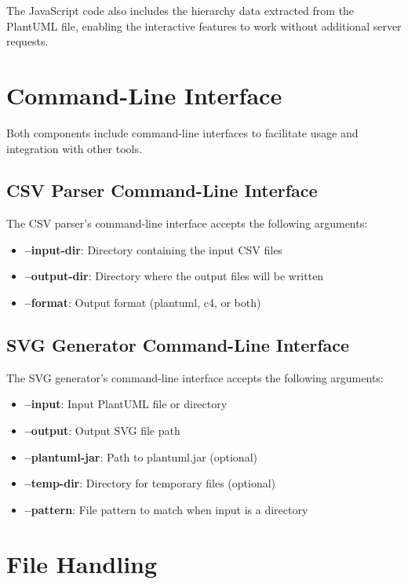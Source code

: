 \documentclass[a4paper,12pt]{article}
\begin{document}
The JavaScript code also includes the hierarchy data extracted from the PlantUML file, enabling the interactive features to work without additional server requests.

\section{Command-Line Interface}

Both components include command-line interfaces to facilitate usage and integration with other tools.

\subsection{CSV Parser Command-Line Interface}

The CSV parser's command-line interface accepts the following arguments:

\begin{itemize}
    \item \textbf{--input-dir}: Directory containing the input CSV files
    \item \textbf{--output-dir}: Directory where the output files will be written
    \item \textbf{--format}: Output format (plantuml, c4, or both)
\end{itemize}

\subsection{SVG Generator Command-Line Interface}

The SVG generator's command-line interface accepts the following arguments:

\begin{itemize}
    \item \textbf{--input}: Input PlantUML file or directory
    \item \textbf{--output}: Output SVG file path
    \item \textbf{--plantuml-jar}: Path to plantuml.jar (optional)
    \item \textbf{--temp-dir}: Directory for temporary files (optional)
    \item \textbf{--pattern}: File pattern to match when input is a directory
\end{itemize}

\section{File Handling}
\end{document}
